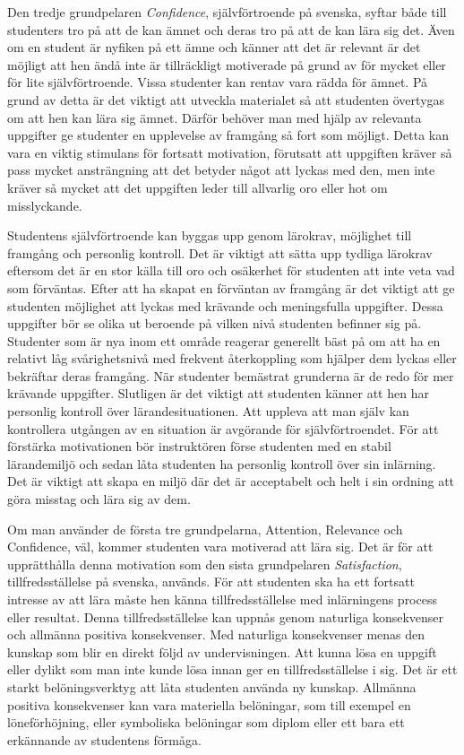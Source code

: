 \documentclass[12pt,a4paper,twoside,openright]{article}
\begin{document}
Den tredje grundpelaren \textit{Confidence}, självförtroende på
svenska, syftar både till studenters tro på att de kan ämnet och deras
tro på att de kan lära sig det. Även om en student är nyfiken på ett
ämne och känner att det är relevant är det möjligt att hen ändå inte
är tillräckligt motiverade på grund av för mycket eller för lite
självförtroende. Vissa studenter kan rentav vara rädda för ämnet. På
grund av detta är det viktigt att utveckla materialet så att studenten
övertygas om att hen kan lära sig ämnet. Därför behöver man med hjälp
av relevanta uppgifter ge studenter en upplevelse av framgång så fort
som möjligt. Detta kan vara en viktig stimulans för fortsatt
motivation, förutsatt att uppgiften kräver så pass mycket ansträngning
att det betyder något att lyckas med den, men inte kräver så mycket
att det uppgiften leder till allvarlig oro eller hot om misslyckande.

Studentens självförtroende kan byggas upp genom lärokrav, möjlighet
till fram\-gång och personlig kontroll. Det är viktigt att sätta upp
tydliga lärokrav eftersom det är en stor källa till oro och osäkerhet
för studenten att inte veta vad som förväntas. Efter att ha
skapat en förväntan av framgång är det viktigt att ge studenten
möjlighet att lyckas med krävande och meningsfulla uppgifter. Dessa
uppgifter bör se olika ut beroende på vilken nivå studenten befinner
sig på. Studenter som är nya inom ett område reagerar generellt bäst
på om att ha en relativt låg svårighetsnivå med frekvent återkoppling
som hjälper dem lyckas eller bekräftar deras framgång. När studenter
bemästrat grunderna är de redo för mer krävande uppgifter. Slutligen
är det viktigt att studenten känner att hen har personlig kontroll
över lärandesituationen. Att uppleva att man själv kan kontrollera
utgången av en situation är avgörande för självförtroendet. För att
förstärka motivationen bör instruktören förse studenten med en stabil
lärandemiljö och sedan låta studenten ha personlig kontroll över sin
inlärning. Det är viktigt att skapa en miljö där det är acceptabelt
och helt i sin ordning att göra misstag och lära sig av dem.

Om man använder de första tre grundpelarna, Attention, Relevance och
Confidence, väl, kommer studenten vara motiverad att lära sig. Det är
för att upprätthålla denna motivation som den sista grundpelaren
\textit{Satisfaction}, tillfredsställelse på svenska, används. För att
studenten ska ha ett fortsatt intresse av att lära måste hen känna
tillfredsställelse med inlärningens process eller resultat. Denna
tillfredsställelse kan uppnås genom naturliga konsekvenser och
allmänna positiva konsekvenser. Med naturliga konsekvenser menas den
kunskap som blir en direkt följd av undervisningen. Att kunna lösa en
uppgift eller dylikt som man inte kunde lösa innan ger en
tillfredsställelse i sig. Det är ett starkt belöningsverktyg att låta
studenten använda ny kunskap. Allmänna positiva konsekvenser kan vara
materiella belöningar, som till exempel en löneförhöjning, eller
symboliska belöningar som diplom eller ett bara ett erkännande av
studentens förmåga.
\end{document}
